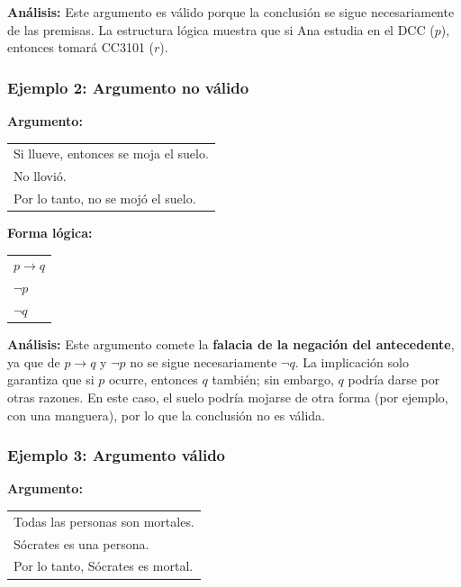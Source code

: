\textbf{Análisis:} Este argumento es válido porque la conclusión se sigue necesariamente de las premisas. La estructura lógica muestra que si Ana estudia en el DCC ($p$), entonces tomará CC3101 ($r$).

\subsubsection{Ejemplo 2: Argumento no válido}
\textbf{Argumento:}

\begin{center}
\begin{tabular}{l}
Si llueve, entonces se moja el suelo.\\
No llovió.\\
\hline
Por lo tanto, no se mojó el suelo.
\end{tabular}
\end{center}

\textbf{Forma lógica:}

\begin{center}
\begin{tabular}{l}
$p \rightarrow q$ \\
$\lnot p$ \\
\hline
$\lnot q$
\end{tabular}
\end{center}

\textbf{Análisis:} 
Este argumento comete la \textbf{falacia de la negación del antecedente}, ya que de \( p \rightarrow q \) y \( \lnot p \) no se sigue necesariamente \( \lnot q \). La implicación solo garantiza que si \( p \) ocurre, entonces \( q \) también; sin embargo, \( q \) podría darse por otras razones. En este caso, el suelo podría mojarse de otra forma (por ejemplo, con una manguera), por lo que la conclusión no es válida.  








\subsubsection{Ejemplo 3: Argumento válido}
\textbf{Argumento:}

\begin{center}
\begin{tabular}{l}
Todas las personas son mortales.\\
Sócrates es una persona.\\
\hline
Por lo tanto, Sócrates es mortal.
\end{tabular}
\end{center}

